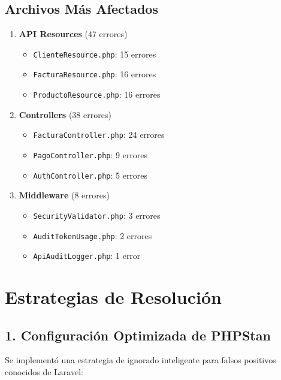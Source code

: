 \documentclass[12pt,a4paper]{article}
\begin{document}
\subsection{Archivos Más Afectados}

\begin{enumerate}
    \item \textbf{API Resources} (47 errores)
    \begin{itemize}
        \item \texttt{ClienteResource.php}: 15 errores
        \item \texttt{FacturaResource.php}: 16 errores
        \item \texttt{ProductoResource.php}: 16 errores
    \end{itemize}

    \item \textbf{Controllers} (38 errores)
    \begin{itemize}
        \item \texttt{FacturaController.php}: 24 errores
        \item \texttt{PagoController.php}: 9 errores
        \item \texttt{AuthController.php}: 5 errores
    \end{itemize}

    \item \textbf{Middleware} (8 errores)
    \begin{itemize}
        \item \texttt{SecurityValidator.php}: 3 errores
        \item \texttt{AuditTokenUsage.php}: 2 errores
        \item \texttt{ApiAuditLogger.php}: 1 error
    \end{itemize}
\end{enumerate}

\section{Estrategias de Resolución}

\subsection{1. Configuración Optimizada de PHPStan}

Se implementó una estrategia de ignorado inteligente para falsos positivos conocidos de Laravel:
\end{document}
